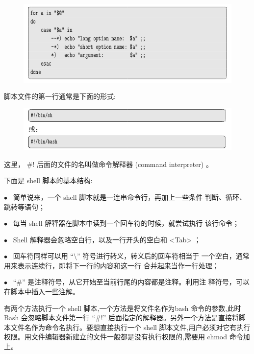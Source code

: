 \documentclass[12pt，a4paper]{article}
\numberwithin{equation}{section}
\begin{document}
\begin{figure}[H]
\centering
\includegraphics[scale=0.6]{./figures/259.png}
\end{figure}
脚本文件的第一行通常是下面的形式:
\begin{figure}[H]
\centering
\includegraphics[scale=0.6]{./figures/260.png}
\end{figure}
这里， \#! 后面的文件的名叫做命令解释器 (command interpreter) 。

下面是 shell 脚本的基本结构:

$\bullet$~ 简单说来，一个 shell 脚本就是一连串命令行，再加上一些条件
判断、循环、跳转等语句；

$\bullet$~ 每当 shell 解释器在脚本中读到一个回车符的时候，就尝试执行
该行命令；

$\bullet$~ Shell 解释器会忽略空白行，以及一行开头的空白和 <Tab> ；

$\bullet$~ 回车符同样可以用 “$\setminus$” 符号进行转义，转义后的回车符相当于
一个空白，通常用来表示连续行，即将下一行的内容和这一行
合并起来当作一行处理；

$\bullet$~ “\#” 是注释符号，从它开始至当前行尾的内容都是注释。利用注
释符号，可以在脚本中插入一些注解。

有两个方法执行一个 shell 脚本,一个方法是将文件名作为bash 命令的参数,此时 Bash 会忽略脚本文件第一行 “\#!” 后面指定的解释器。另外一个方法是直接将脚本文件名作为命令名执行。要想直接执行一个 shell 脚本文件,用户必须对它有执行权限。用文件编辑器新建立的文件一般都是没有执行权限的,需要用 chmod 命令加上。
\end{document}

